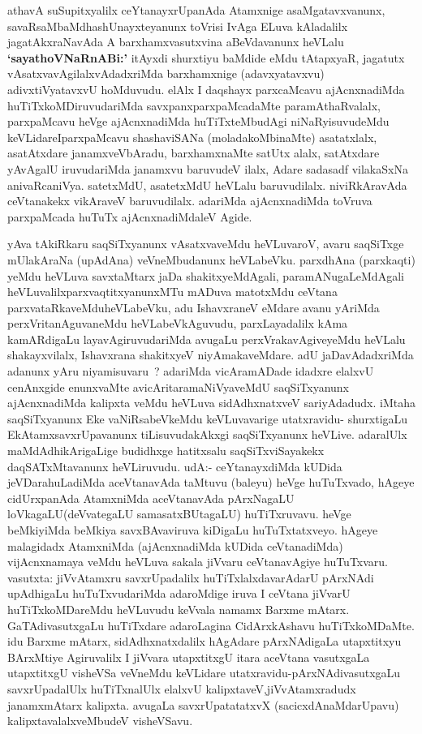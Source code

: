 \begin{artha}
athavA suSupitxyalilx ceYtanayxrUpanAda Atamxnige asaMgatavxvanunx,
savaR\-saMbaMdhashUnayxteyanunx toVrisi IvAga ELuva kAladalilx
jagatAkxraNavAda A barxhamxvasutxvina aBeVdavanunx heVLalu
\textbf{`sayathoVNaRnABi:'} \mdash itAyxdi shurxtiyu baMdide eMdu tAtapxyaR,
jagatutx vAsatxvavAgilalxvAdadxriMda barxhamxnige (adavxyatavxvu)
adivxtiVyatavxvU hoMduvudu. elAlx I daqshayx parxcaMcavu ajAcnxnadiMda
huTiTxkoMDiruvudariMda savxpanxparxpaMcadaMte paramAthaRvalalx,
parxpaMcavu heVge ajAcnxnadiMda huTiTxteMbudAgi niNaRyisuvudeMdu
keVLidare\ndash I\break parxpaMcavu shashaviSANa (moladakoMbinaMte) asatatxlalx,
asatAtxdare janamxveVbAradu, barxhamxnaMte satUtx alalx, satAtxdare
yAvAgalU iruvudariMda janamxvu baruvudeV ilalx, Adare sadasadf
vilakaSxNa anivaRcaniVya. satetxMdU, asatetxMdU heVLalu
baruvudilalx. niviRkAravAda ceVtanakekx vikAraveV
baruvudilalx. adariMda ajAcnxnadiMda toVruva parxpaMcada huTuTx
ajAcnxnadiMdaleV Agide.
\end{artha}

\begin{artha}
yAva tAkiRkaru saqSiTxyanunx vAsatxvaveMdu heVLuvaroV, avaru saqSiTxge
 mUlakAraNa (upAdAna) veVneMbudanunx heVLabeVku. parxdhAna
(parxkaqti) yeMdu heVLuva savxtaMtarx jaDa shakitxyeMdAgali,
paramANugaLeMdAgali heVLuvalilx\break parxvaqtitxyanunxMTu mADuva matotxMdu
ceVtana parxvataRkaveMduheVLabeVku, adu 	 IshavxraneV eMdare avanu
yAriMda perxVritanAguvaneMdu heVLabeVkAguvudu,  parxLayadalilx kAma
kamARdigaLu layavAgiruvudariMda avugaLu perxVrakavAgiveyeMdu heVLalu
shakayxvilalx, Ishavxrana shakitxyeV
niyAmakaveMdare. adU jaDavAdadxriMda adanunx yAru niyamisuvaru~?
adariMda vicAramADade idadxre elalxvU cenAnxgide enunxvaMte
avicAritaramaNiVyaveMdU saqSiTxyanunx ajAcnxnadiMda kalipxta veMdu
heVLuva sidAdhxnatxveV sariyAdadudx. iMtaha saqSiTxyanunx Eke
vaNiRsabeVkeMdu keVLuvavarige utatxravidu- shurxtigaLu
EkAtamxsavxrUpavanunx tiLisuvudakAkxgi saqSiTxyanunx
heVLive. adaralUlx maMdAdhikArigaLige budidhxge hatitxsalu
saqSiTxviSayakekx daqSATxMtavanunx heVLiruvudu. udA:-
ceYtanayxdiMda kUDida jeVDarahuLadiMda aceVtanavAda taMtuvu (baleyu) heVge
huTuTxvado, hAgeye cidUrxpanAda AtamxniMda aceVtanavAda pArxNagaLU
loVkagaLU(deVvategaLU samasatxBUtagaLU) huTiTxruvavu. heVge beMkiyiMda
beMkiya savxBAvaviruva kiDigaLu huTuTxtatxveyo. hAgeye malagidadx
AtamxniMda (ajAcnxnadiMda kUDida ceVtanadiMda) vijAcnxnamaya veMdu
heVLuva sakala jiVvaru ceVtanavAgiye huTuTxvaru. vasutxta: jiVvAtamxru
savxrUpadalilx huTiTxlalxdavarAdarU pArxNAdi upAdhigaLu
huTuTxvudariMda adaroMdige iruva I ceVtana jiVvarU huTiTxkoMDareMdu
heVLuvudu keVvala namamx Barxme mAtarx. GaTAdivasutxgaLu huTiTxdare
adaroLagina CidArxkAshavu huTiTxkoMDaMte. idu Barxme mAtarx,
sidAdhxnatxdalilx hAgAdare pArxNAdigaLa utapxtitxyu BArxMtiye
Agiruvalilx I jiVvara utapxtitxgU itara aceVtana vasutxgaLa
utapxtitxgU visheVSa veVneMdu keVLidare utatxravidu-pArxNAdivasutxgaLu
savxrUpadalUlx huTiTxnalUlx elalxvU kalipxtaveV,\break jiVvAtamxradudx
janamxmAtarx kalipxta. avugaLa savxrUpatatatxvX (sacicxdAnaMdarUpavu)
kalipxtavalalxveMbudeV visheVSavu.
\end{artha}


